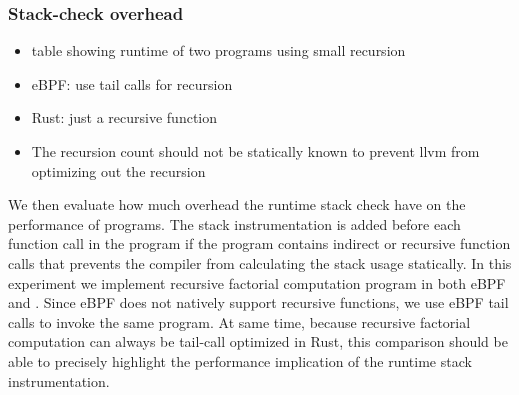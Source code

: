 \subsubsection{Stack-check overhead}
\begin{itemize}
    \item table showing runtime of two programs using small recursion
    \item eBPF: use tail calls for recursion
    \item Rust: just a recursive function
    \item The recursion count should not be statically known to prevent llvm
        from optimizing out the recursion
\end{itemize}

We then evaluate how much overhead the runtime stack check have on the
    performance of \projname{} programs.
The stack instrumentation is added before each
    function call in the \projname{} program if the program contains indirect
    or recursive function calls that prevents the compiler from calculating the
    stack usage statically.
In this experiment we implement recursive factorial computation program in both
    eBPF and \projname{}.
Since eBPF does not natively support recursive functions, we use eBPF tail
    calls to invoke the same program.
At same time, because recursive factorial computation can always be tail-call
    optimized in Rust, this comparison should be able to precisely highlight
    the performance implication of the runtime stack instrumentation.

